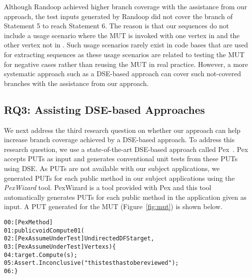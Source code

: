 Although Randoop achieved higher branch coverage with the assistance from our approach, the test inputs generated by Randoop did not cover the  branch of Statement 5 to reach Statement 6. The reason is that our sequences do not include a usage scenario where the  MUT is invoked with one vertex in  and the other vertex not in . Such usage scenarios rarely exist in code bases that are used for extracting sequences as these usage scenarios are related to testing the MUT for negative cases rather than reusing the MUT in real practice. However, a more systematic approach such as a DSE-based approach can cover such not-covered branches with the assistance from our approach.

\subsection{RQ3: Assisting DSE-based Approaches}

We next address the third research question on whether our approach can help increase branch coverage achieved by a DSE-based approach. To address this research question, we use a state-of-the-art DSE-based approach called Pex~\cite{tillman:pexwhite}. Pex accepts PUTs as input and generates conventional unit tests from these PUTs using DSE. As PUTs are not available with our subject applications, we generated PUTs for each public method in our subject applications using the \emph{PexWizard} tool. PexWizard is a tool provided with Pex and this tool automatically generates PUTs for each public method in the application given as input. A PUT generated for the  MUT (Figure~\ref{fig:mut}) is shown below.

\begin{CodeOut}
\begin{alltt}
00:[PexMethod]
01:public void Compute01(
02:\hspace*{0.3in}[PexAssumeUnderTest]UndirectedDFS target,
03:\hspace*{0.3in}[PexAssumeUnderTest]Vertex s) \{
04:\hspace*{0.1in}target.Compute(s);
05:\hspace*{0.1in}Assert.Inconclusive("this test has to be reviewed");
06:\}
\end{alltt}
\end{CodeOut}

